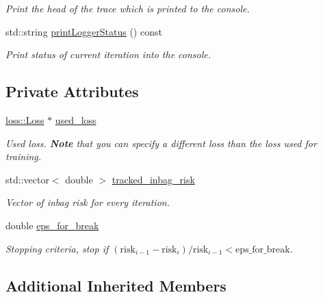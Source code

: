 \begin{DoxyCompactItemize}
\begin{DoxyCompactList}\small\item\em Print the head of the trace which is printed to the console. \end{DoxyCompactList}\item 
std\+::string \hyperlink{classlogger_1_1_inbag_risk_logger_a040213adf29a645f0fd5356b951627d0}{print\+Logger\+Status} () const
\begin{DoxyCompactList}\small\item\em Print status of current iteration into the console. \end{DoxyCompactList}\end{DoxyCompactItemize}
\subsection*{Private Attributes}
\begin{DoxyCompactItemize}
\item 
\hyperlink{classloss_1_1_loss}{loss\+::\+Loss} $\ast$ \hyperlink{classlogger_1_1_inbag_risk_logger_afee746bf4009661f930ea8294e7f72fc}{used\+\_\+loss}
\begin{DoxyCompactList}\small\item\em Used loss. {\bfseries Note} that you can specify a different loss than the loss used for training. \end{DoxyCompactList}\item 
std\+::vector$<$ double $>$ \hyperlink{classlogger_1_1_inbag_risk_logger_aed427deee828fd480e5fa9536360b16b}{tracked\+\_\+inbag\+\_\+risk}
\begin{DoxyCompactList}\small\item\em Vector of inbag risk for every iteration. \end{DoxyCompactList}\item 
double \hyperlink{classlogger_1_1_inbag_risk_logger_a1890b49b8ffe85e1bc65b4f8ab7999fe}{eps\+\_\+for\+\_\+break}
\begin{DoxyCompactList}\small\item\em Stopping criteria, stop if $(\mathrm{risk}_{i-1} - \mathrm{risk}_i) / \mathrm{risk}_{i-1} < \mathrm{eps\_for\_break}$. \end{DoxyCompactList}\end{DoxyCompactItemize}
\subsection*{Additional Inherited Members}


